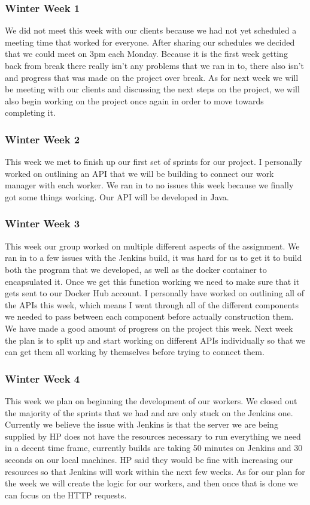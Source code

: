 \documentclass[onecolumn, draftclsnofoot,10pt, compsoc]{IEEEtran}
\begin{document}
\subsubsection*{Winter Week 1}

We did not meet this week with our clients because we had not yet scheduled a meeting time that worked for everyone. After sharing our schedules we decided that we could meet on 3pm each Monday. Because it is the first week getting back from break there really isn't any problems that we ran in to, there also isn't and progress that was made on the project over break. As for next week we will be meeting with our clients and discussing the next steps on the project, we will also begin working on the project once again in order to move towards completing it.
\subsubsection*{Winter Week 2}
This week we met to finish up our first set of sprints for our project. I personally worked on outlining an API that we will be building to connect our work manager with each worker. We ran in to no issues this week because we finally got some things working. Our API will be developed in Java.
\subsubsection*{Winter Week 3}

This week our group worked on multiple different aspects of the assignment. We ran in to a few issues with the Jenkins build, it was hard for us to get it to build both the program that we developed, as well as the docker container to encapsulated it. Once we get this function working we need to make sure that it gets sent to our Docker Hub account. I personally have worked on outlining all of the APIs this week, which means I went through all of the different components we needed to pass between each component before actually construction them. We have made a good amount of progress on the project this week. Next week the plan is to split up and start working on different APIs individually so that we can get them all working by themselves before trying to connect them. 
\subsubsection*{Winter Week 4}
This week we plan on beginning the development of our workers. We closed out the majority of the sprints that we had and are only stuck on the Jenkins one. Currently we believe the issue with Jenkins is that the server we are being supplied by HP does not have the resources necessary to run everything we need in a decent time frame, currently builds are taking 50 minutes on Jenkins and 30 seconds on our local machines. HP said they would be fine with increasing our resources so that Jenkins will work within the next few weeks. As for our plan for the week we will create the logic for our workers, and then once that is done we can focus on the HTTP requests.
\end{document}
